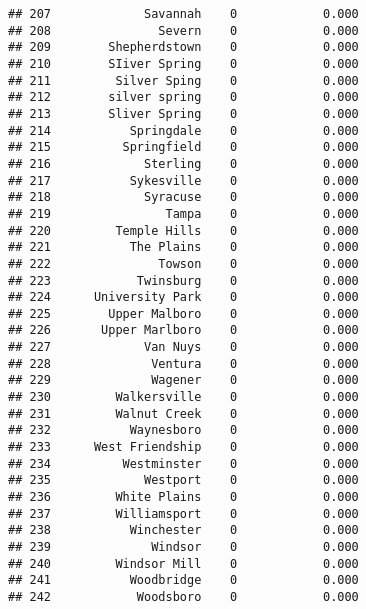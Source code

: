 \documentclass[]{article}
\newenvironment{Shaded}{\begin{snugshade}}{\end{snugshade}}
\newcommand{\KeywordTok}[1]{\textcolor[rgb]{0.13,0.29,0.53}{\textbf{#1}}}
\newcommand{\DataTypeTok}[1]{\textcolor[rgb]{0.13,0.29,0.53}{#1}}
\newcommand{\DecValTok}[1]{\textcolor[rgb]{0.00,0.00,0.81}{#1}}
\newcommand{\StringTok}[1]{\textcolor[rgb]{0.31,0.60,0.02}{#1}}
\newcommand{\OperatorTok}[1]{\textcolor[rgb]{0.81,0.36,0.00}{\textbf{#1}}}
\newcommand{\NormalTok}[1]{#1}
\begin{document}
\begin{verbatim}
## 207             Savannah    0            0.000
## 208               Severn    0            0.000
## 209        Shepherdstown    0            0.000
## 210        SIiver Spring    0            0.000
## 211         Silver Sping    0            0.000
## 212        silver spring    0            0.000
## 213        Sliver Spring    0            0.000
## 214           Springdale    0            0.000
## 215          Springfield    0            0.000
## 216             Sterling    0            0.000
## 217           Sykesville    0            0.000
## 218             Syracuse    0            0.000
## 219                Tampa    0            0.000
## 220         Temple Hills    0            0.000
## 221           The Plains    0            0.000
## 222               Towson    0            0.000
## 223            Twinsburg    0            0.000
## 224      University Park    0            0.000
## 225        Upper Malboro    0            0.000
## 226       Upper Marlboro    0            0.000
## 227             Van Nuys    0            0.000
## 228              Ventura    0            0.000
## 229              Wagener    0            0.000
## 230         Walkersville    0            0.000
## 231         Walnut Creek    0            0.000
## 232           Waynesboro    0            0.000
## 233      West Friendship    0            0.000
## 234          Westminster    0            0.000
## 235             Westport    0            0.000
## 236         White Plains    0            0.000
## 237         Williamsport    0            0.000
## 238           Winchester    0            0.000
## 239              Windsor    0            0.000
## 240         Windsor Mill    0            0.000
## 241           Woodbridge    0            0.000
## 242            Woodsboro    0            0.000
\end{verbatim}

\begin{Shaded}
\end{Shaded}
\end{document}
